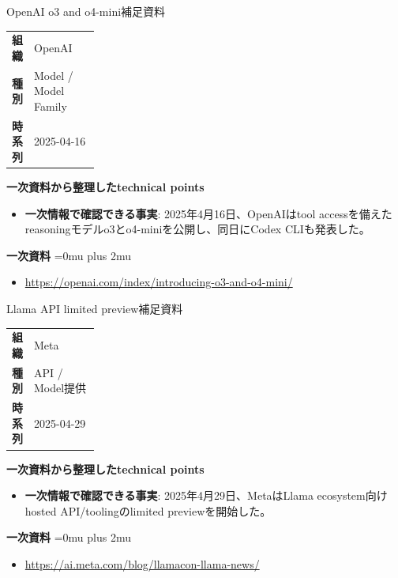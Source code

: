 \begin{technicalnote}{OpenAI o3 and o4-mini}{補足資料}
\begingroup
\begin{tabularx}{\linewidth}{@{}>{\bfseries}p{0.22\linewidth}X@{}}
組織 & OpenAI \\
種別 & Model / Model Family \\
時系列 & 2025-04-16 \\
\end{tabularx}
\smallskip
{\bfseries 一次資料から整理したtechnical points}
\begin{itemize}[leftmargin=1.5em,itemsep=0.35em]
\item \textbf{一次情報で確認できる事実}: 2025年4月16日、OpenAIはtool accessを備えたreasoningモデルo3とo4-miniを公開し、同日にCodex CLIも発表した。
\end{itemize}
\begin{samepage}
{\bfseries 一次資料}
\begingroup\sloppy
\Urlmuskip=0mu plus 2mu\relax
\begin{itemize}[leftmargin=1.5em,itemsep=0.25em]
\item {\scriptsize\url{https://openai.com/index/introducing-o3-and-o4-mini/}}
\end{itemize}
\endgroup
\end{samepage}
\endgroup
\end{technicalnote}
\medskip

\begin{technicalnote}{Llama API limited preview}{補足資料}
\begingroup
\begin{tabularx}{\linewidth}{@{}>{\bfseries}p{0.22\linewidth}X@{}}
組織 & Meta \\
種別 & API / Model提供 \\
時系列 & 2025-04-29 \\
\end{tabularx}
\smallskip
{\bfseries 一次資料から整理したtechnical points}
\begin{itemize}[leftmargin=1.5em,itemsep=0.35em]
\item \textbf{一次情報で確認できる事実}: 2025年4月29日、MetaはLlama ecosystem向けhosted API/toolingのlimited previewを開始した。
\end{itemize}
\begin{samepage}
{\bfseries 一次資料}
\begingroup\sloppy
\Urlmuskip=0mu plus 2mu\relax
\begin{itemize}[leftmargin=1.5em,itemsep=0.25em]
\item {\scriptsize\url{https://ai.meta.com/blog/llamacon-llama-news/}}
\end{itemize}
\endgroup
\end{samepage}
\endgroup
\end{technicalnote}
\medskip

